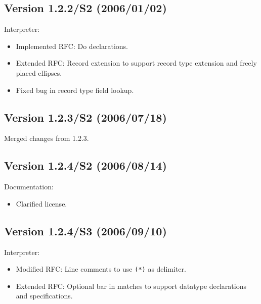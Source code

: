\documentclass[twoside,titlepage]{article}
\begin{document}
\begin{appendix}
\subsection*{Version 1.2.2/S2 (2006/01/02)}

Interpreter:
\begin{itemize} \setlength{\itemsep}{0em}
\item Implemented RFC: Do declarations.
\item Extended RFC: Record extension to support record type extension and freely placed ellipses.
\item Fixed bug in record type field lookup.
\end{itemize}

\subsection*{Version 1.2.3/S2 (2006/07/18)}

Merged changes from 1.2.3.

\subsection*{Version 1.2.4/S2 (2006/08/14)}

Documentation:
\begin{itemize} \setlength{\itemsep}{0em}
\item Clarified license.
\end{itemize}

\subsection*{Version 1.2.4/S3 (2006/09/10)}

Interpreter:
\begin{itemize} \setlength{\itemsep}{0em}
\item Modified RFC: Line comments to use {\tt (*)} as delimiter.
\item Extended RFC: Optional bar in matches to support datatype declarations and specifications.
\end{itemize}


\end{appendix}
\end{document}
